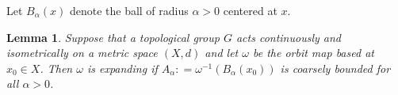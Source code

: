 \documentclass[twoside]{amsart}
\theoremstyle{plain}
\newtheorem{lemma}[theorem]{Lemma}
\theoremstyle{break}
\theoremstyle{definition}
\theoremstyle{remark}
\newcommand{\dfn}{\mathrel{\mathop:}=}
\begin{document}


  Let $B_\alpha(x)$ denote the ball of radius $\alpha > 0$ centered
  at $x$. %

\begin{lemma}\label{lem:expanding_orbit_map}
    Suppose that a topological group $G$
    acts continuously and isometrically on a metric space $(X,d)$
    and let $\omega$ be the orbit map based at $x_0 \in X$.
    Then $\omega$ is expanding if $A_\alpha \dfn \omega^{-1}(B_\alpha(x_0))$
    is coarsely bounded for all $\alpha > 0$. 
\end{lemma}
\end{document}
